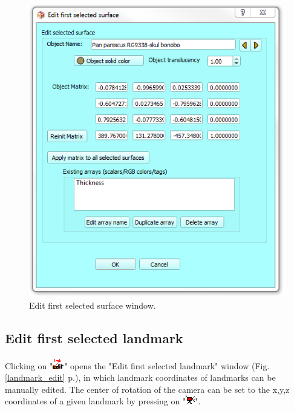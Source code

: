 \begin{figure}
  \centering
  \includegraphics[scale=0.55]{images/06/objects/edit_surface.png} 
	\caption{Edit first selected surface window.}
\label{actor_edit}
 
\end{figure}



\subsection{Edit first selected landmark}
Clicking on "\includegraphics[scale=0.7]{images/06/objects/landmark_edit.png}" opens the "Edit first selected landmark" window (Fig. \ref{landmark_edit} p.\pageref{landmark_edit}), in which landmark coordinates of landmarks can be manually edited. The center of rotation of the camera can be set to the x,y,z coordinates of a given landmark by pressing on "\includegraphics[scale=0.7]{images/06/objects/move_cam3.png}".




